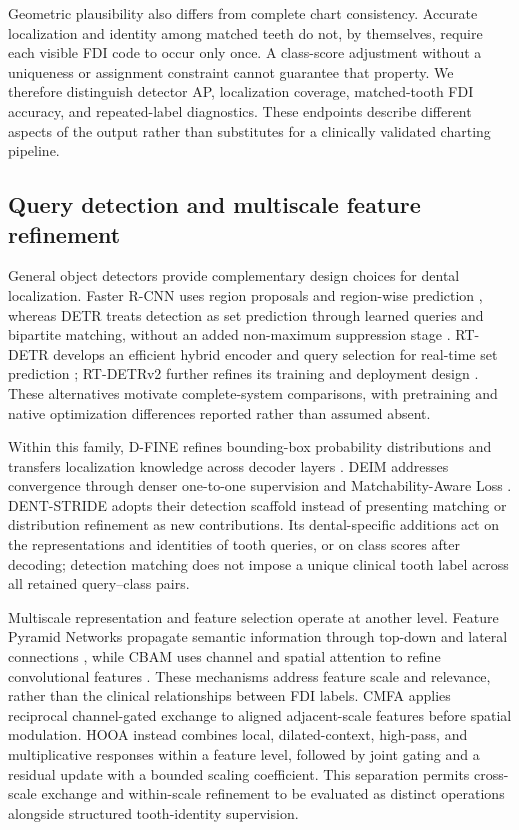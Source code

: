 \documentclass[a4paper,fleqn]{cas-dc}
\begin{document}
Geometric plausibility also differs from complete chart consistency. Accurate localization and identity among matched teeth do not, by themselves, require each visible FDI code to occur only once. A class-score adjustment without a uniqueness or assignment constraint cannot guarantee that property. We therefore distinguish detector AP, localization coverage, matched-tooth FDI accuracy, and repeated-label diagnostics. These endpoints describe different aspects of the output rather than substitutes for a clinically validated charting pipeline.

\subsection{Query detection and multiscale feature refinement}

General object detectors provide complementary design choices for dental localization. Faster R-CNN uses region proposals and region-wise prediction \citep{ren2015faster}, whereas DETR treats detection as set prediction through learned queries and bipartite matching, without an added non-maximum suppression stage \citep{carion2020detr}. RT-DETR develops an efficient hybrid encoder and query selection for real-time set prediction \citep{zhao2024rtdetr}; RT-DETRv2 further refines its training and deployment design \citep{lv2024rtdetrv2}. These alternatives motivate complete-system comparisons, with pretraining and native optimization differences reported rather than assumed absent.

Within this family, D-FINE refines bounding-box probability distributions and transfers localization knowledge across decoder layers \citep{peng2025dfine}. DEIM addresses convergence through denser one-to-one supervision and Matchability-Aware Loss \citep{huang2025deim}. DENT-STRIDE adopts their detection scaffold instead of presenting matching or distribution refinement as new contributions. Its dental-specific additions act on the representations and identities of tooth queries, or on class scores after decoding; detection matching does not impose a unique clinical tooth label across all retained query--class pairs.

Multiscale representation and feature selection operate at another level. Feature Pyramid Networks propagate semantic information through top-down and lateral connections \citep{lin2017fpn}, while CBAM uses channel and spatial attention to refine convolutional features \citep{woo2018cbam}. These mechanisms address feature scale and relevance, rather than the clinical relationships between FDI labels. CMFA applies reciprocal channel-gated exchange to aligned adjacent-scale features before spatial modulation. HOOA instead combines local, dilated-context, high-pass, and multiplicative responses within a feature level, followed by joint gating and a residual update with a bounded scaling coefficient. This separation permits cross-scale exchange and within-scale refinement to be evaluated as distinct operations alongside structured tooth-identity supervision.
\end{document}
